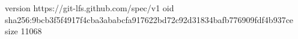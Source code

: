 version https://git-lfs.github.com/spec/v1
oid sha256:9bcb3f5f4917f4cba3ababcfa917622bd72c92d31834bafb776909fdf4b937ce
size 11068

